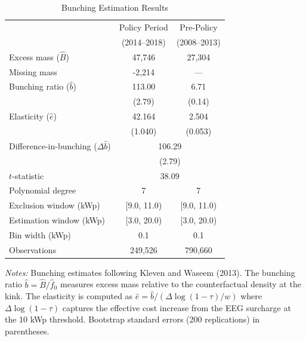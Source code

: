\begin{table}[htbp]
\centering
\caption{Bunching Estimation Results}
\label{tab:bunching}
\begin{tabular}{lcc}
\hline\hline
 & Policy Period & Pre-Policy \\
 & (2014--2018) & (2008--2013) \\
\hline
Excess mass ($\hat{B}$) & 47,746 & 27,304 \\
Missing mass & -2,214 & --- \\
Bunching ratio ($\hat{b}$) & 113.00 & 6.71 \\
 & (2.79) & (0.14) \\
Elasticity ($\hat{e}$) & 42.164 & 2.504 \\
 & (1.040) & (0.053) \\
\hline
Difference-in-bunching ($\Delta \hat{b}$) & \multicolumn{2}{c}{106.29} \\
 & \multicolumn{2}{c}{(2.79)} \\
$t$-statistic & \multicolumn{2}{c}{38.09} \\
\hline
Polynomial degree & 7 & 7 \\
Exclusion window (kWp) & [9.0, 11.0) & [9.0, 11.0) \\
Estimation window (kWp) & [3.0, 20.0) & [3.0, 20.0) \\
Bin width (kWp) & 0.1 & 0.1 \\
Observations & 249,526 & 790,660 \\
\hline\hline
\end{tabular}
\begin{tablenotes}
\small
\item \textit{Notes:} Bunching estimates following Kleven and Waseem (2013). The bunching ratio $\hat{b} = \hat{B}/\hat{f}_0$ measures excess mass relative to the counterfactual density at the kink. The elasticity is computed as $\hat{e} = \hat{b}/(\Delta \log(1-\tau)/w)$ where $\Delta \log(1-\tau)$ captures the effective cost increase from the EEG surcharge at the 10 kWp threshold. Bootstrap standard errors (200 replications) in parentheses.
\end{tablenotes}
\end{table}
